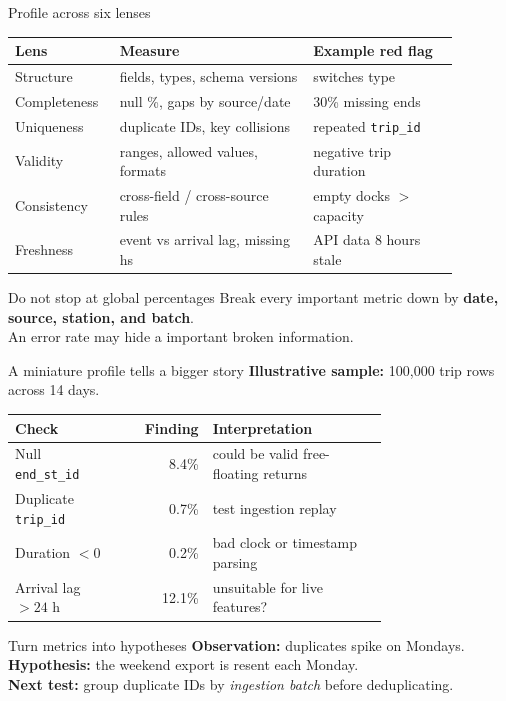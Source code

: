 \documentclass[aspectratio=43,10pt]{beamer}
\begin{document}
\begin{frame}{Profile across six lenses}
\small
\begin{tabular}{p{0.18\linewidth}p{0.40\linewidth}p{0.30\linewidth}}
\toprule
\textbf{Lens} & \textbf{Measure} & \textbf{Example red flag}\\
\midrule
Structure & fields, types, schema versions & switches type\\
Completeness & null \%, gaps by source/date & 30\% missing ends\\
Uniqueness & duplicate IDs, key collisions & repeated \texttt{trip\_id}\\
Validity & ranges, allowed values, formats & negative trip duration\\
Consistency & cross-field / cross-source rules & empty docks $>$ capacity\\
Freshness & event vs arrival lag, missing hs & API data 8 hours stale\\
\bottomrule
\end{tabular}
\vspace{0.8em}
\begin{block}{Do not stop at global percentages}
Break every important metric down by \textbf{date, source, station, and batch}.\\
An error rate may hide a important broken information.
\end{block}
\end{frame}

\begin{frame}{A miniature profile tells a bigger story}
\textbf{Illustrative sample:} 100,000 trip rows across 14 days.

\medskip
\begin{tabular}{p{0.27\linewidth}r p{0.47\linewidth}}
\toprule
\textbf{Check} & \textbf{Finding} & \textbf{Interpretation}\\
\midrule
Null \texttt{end\_st\_id} & 8.4\% & could be valid free-floating returns\\
Duplicate \texttt{trip\_id} & 0.7\% & test ingestion replay\\
Duration $<0$ & 0.2\% & bad clock or timestamp parsing\\
Arrival lag $>24$ h & 12.1\% & unsuitable for live features?\\
\bottomrule
\end{tabular}
\vspace{0.8em}
\begin{block}{Turn metrics into hypotheses}
\textbf{Observation:} duplicates spike on Mondays.\\
\textbf{Hypothesis:} the weekend export is resent each Monday.\\
\textbf{Next test:} group duplicate IDs by \emph{ingestion batch} before deduplicating.
\end{block}
\end{frame}
\end{document}
